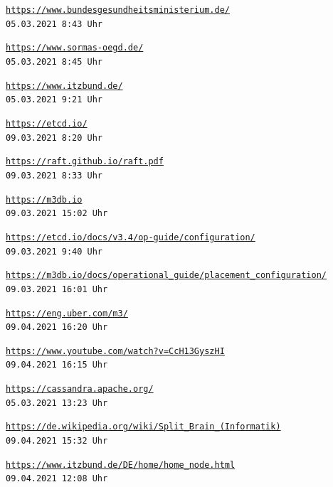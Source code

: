 \documentclass[11pt,a4paper]{article}
\begin{document}
\newpage
%
\begin{thebibliography}{9}

  \texttt{\url{https://www.bundesgesundheitsministerium.de/}}
  \\\hfill \texttt{05.03.2021 8:43 Uhr}

  \texttt{\url{https://www.sormas-oegd.de/}}
  \\\hfill \texttt{05.03.2021 8:45 Uhr}

  \texttt{\url{https://www.itzbund.de/}}
  \\\hfill \texttt{05.03.2021 9:21 Uhr}

  \texttt{\url{https://etcd.io/}}
  \\\hfill \texttt{09.03.2021 8:20 Uhr}

  \texttt{\url{https://raft.github.io/raft.pdf}}
  \\\hfill \texttt{09.03.2021 8:33 Uhr}

  \texttt{\url{https://m3db.io}}
  \\\hfill \texttt{09.03.2021 15:02 Uhr}

  \texttt{\url{https://etcd.io/docs/v3.4/op-guide/configuration/}}
  \\\hfill \texttt{09.03.2021 9:40 Uhr}

  \texttt{\url{https://m3db.io/docs/operational_guide/placement_configuration/}}
  \\\hfill \texttt{09.03.2021 16:01 Uhr}

  \texttt{\url{https://eng.uber.com/m3/}}
  \\\hfill \texttt{09.04.2021 16:20 Uhr}

  \texttt{\url{https://www.youtube.com/watch?v=CcH13GyszHI}}
  \\\hfill \texttt{09.04.2021 16:15 Uhr}

  \texttt{\url{https://cassandra.apache.org/}}
  \\\hfill \texttt{05.03.2021 13:23 Uhr}

  \texttt{\url{https://de.wikipedia.org/wiki/Split_Brain_(Informatik)}}
  \\\hfill \texttt{09.04.2021 15:32 Uhr}

  \texttt{\url{https://www.itzbund.de/DE/home/home_node.html}}
  \\\hfill \texttt{09.04.2021 12:08 Uhr}



\end{thebibliography}
\end{document}
